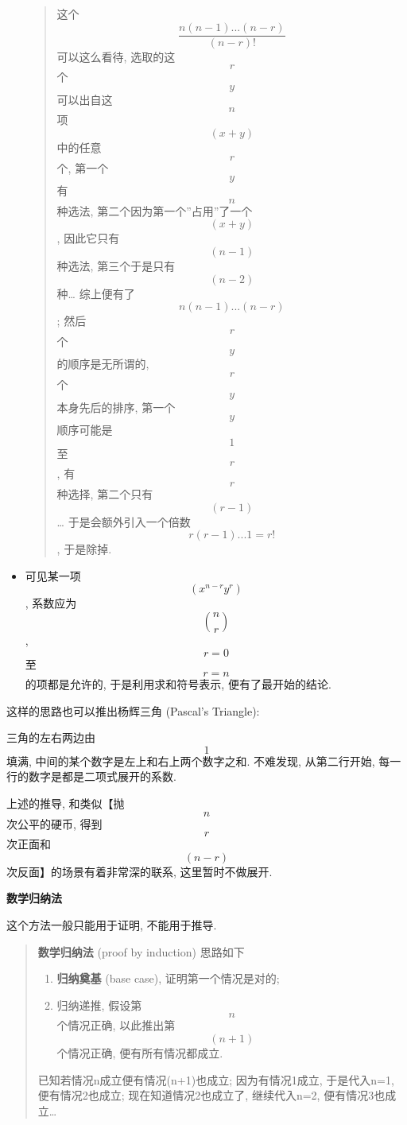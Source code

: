 \begin{itemize}
  \begin{quote}
  这个 \[\frac{n(n-1)...(n-r)}{(n-r)!}\] 可以这么看待, 选取的这 \[r\] 个
  \[y\] 可以出自这 \[n\] 项 \[(x+y)\] 中的任意 \[r\] 个, 第一个 \[y\] 有
  \[n\] 种选法, 第二个因为第一个''占用''了一个 \[(x+y)\], 因此它只有
  \[(n-1)\] 种选法, 第三个于是只有 \[(n-2)\] 种\ldots{} 综上便有了
  \[n(n-1)...(n-r)\]; 然后 \[r\] 个 \[y\] 的顺序是无所谓的, \[r\] 个
  \[y\] 本身先后的排序, 第一个 \[y\] 顺序可能是 \[1\] 至 \[r\], 有 \[r\]
  种选择, 第二个只有 \[(r-1)\]\ldots{} 于是会额外引入一个倍数
  \[r(r-1)...1=r!\], 于是除掉.
  \end{quote}
\item
  可见某一项 \[(x^{n-r}y^r)\], 系数应为 \[\binom{n}{r}\], \[r=0\] 至
  \[r=n\] 的项都是允许的, 于是利用求和符号表示, 便有了最开始的结论.
\end{itemize}

这样的思路也可以推出杨辉三角 (Pascal's Triangle):

\begin{Shaded}
\begin{Highlighting}[]
     
      
       
        
\end{Highlighting}
\end{Shaded}

三角的左右两边由 \[1\] 填满, 中间的某个数字是左上和右上两个数字之和.
不难发现, 从第二行开始, 每一行的数字是都是二项式展开的系数.

上述的推导, 和类似【抛 \[n\] 次公平的硬币, 得到 \[r\] 次正面和 \[(n-r)\]
次反面】的场景有着非常深的联系, 这里暂时不做展开.

\textbf{数学归纳法}

这个方法一般只能用于证明, 不能用于推导.

\begin{quote}
\textbf{数学归纳法} (proof by induction) 思路如下

\begin{enumerate}
\def\labelenumi{\arabic{enumi}.}
\tightlist
\item
  \textbf{归纳奠基} (base case), 证明第一个情况是对的;
\item
  归纳递推, 假设第 \[n\] 个情况正确, 以此推出第 \[(n+1)\] 个情况正确,
  便有所有情况都成立.
\end{enumerate}

已知若情况n成立便有情况(n+1)也成立; 因为有情况1成立, 于是代入n=1,
便有情况2也成立; 现在知道情况2也成立了, 继续代入n=2,
便有情况3也成立\ldots{}
\end{quote}

